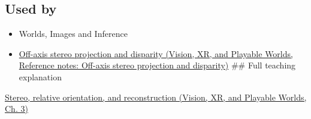 \subsection{Used by}\label{appendix-c4e98b6e4001-used-by}

\hypertarget{appendix-c4e98b6e4001-used-by}{}

\begin{itemize}
\item
  {Worlds, Images and Inference}
\item
  \href{../07-Vision-XR-and-Playable-Worlds/main.pdf\#nameddest=appendix-0976e86e5b9f}{Off-axis stereo projection and disparity (Vision, XR, and Playable Worlds, Reference notes: Off-axis stereo projection and disparity)} \#\# Full teaching explanation
\end{itemize}

\href{../07-Vision-XR-and-Playable-Worlds/main.pdf\#nameddest=04-visual-computing-ii-ch032-stereo-relative-orientation-and-reconstruction}{Stereo, relative orientation, and reconstruction (Vision, XR, and Playable Worlds, Ch. 3)}
